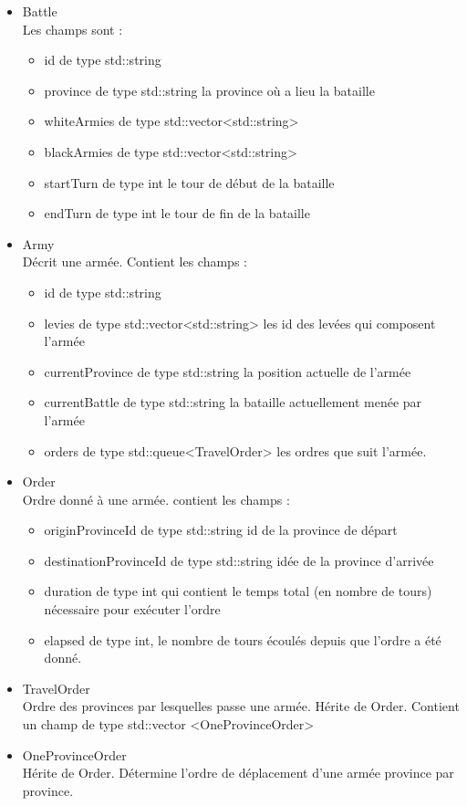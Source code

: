 \documentclass[a4paper,12pt]{article}
\begin{document}
\begin{itemize}
\item Battle\\
Les champs sont :
\begin{itemize}
\item id de type std::string
\item province de type std::string la province où a lieu la bataille
\item whiteArmies de type std::vector<std::string>
\item blackArmies de type std::vector<std::string>
\item startTurn de type int le tour de début de la bataille
\item endTurn de type int le tour de fin de la bataille\\
\end{itemize}

\item Army\\
Décrit une armée. Contient les champs : 
\begin{itemize}
\item id de type std::string
\item levies de type std::vector<std::string> les id des levées qui composent l'armée
\item currentProvince de type std::string la position actuelle de l'armée
\item currentBattle de type std::string la bataille actuellement menée par l'armée
\item orders de type std::queue<TravelOrder> les ordres que suit l'armée.
\end{itemize}
\item Order\\
Ordre donné à une armée. contient les champs :
\begin{itemize}
 \item originProvinceId de type std::string id de la province de départ
 \item destinationProvinceId de type std::string idée de la province d'arrivée
 \item duration de type int qui contient le temps total (en nombre de tours) nécessaire pour exécuter l'ordre
 \item elapsed de type int, le nombre de tours écoulés depuis que l'ordre a été donné.
 \end{itemize}
\item TravelOrder\\
Ordre des provinces par lesquelles passe une armée. Hérite de Order. Contient un champ de type std::vector <OneProvinceOrder> 
\item OneProvinceOrder\\
Hérite de Order. Détermine l'ordre de déplacement d'une armée province par province.\\


\end{itemize}
\end{document}
